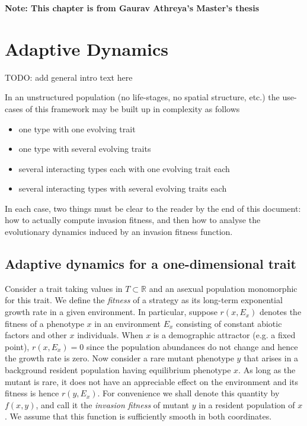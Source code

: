 \textbf{Note: This chapter is from Gaurav Athreya's Master's thesis~\citep{athreya_thesis_2023}}

\chapter{Adaptive Dynamics}


{\color{red}TODO: add general intro text here}

In an unstructured population (no life-stages, no spatial structure, etc.) the use-cases of this framework may be built up in complexity as follows
\begin{itemize} \itemsep -1mm
	\item one type with one evolving trait
	\item one type with several evolving traits
	\item several interacting types each with one evolving trait each
	\item several interacting types with several evolving traits each
\end{itemize}  

In each case, two things must be clear to the reader by the end of this document: how to actually compute invasion fitness, and then how to analyse the evolutionary dynamics induced by an invasion fitness function. 

\section{Adaptive dynamics for a one-dimensional trait}
\label{section:1-dim-AD}

Consider a trait taking values in $T \subset \mathbb{R}$ and an asexual population monomorphic for this trait. We define the \emph{fitness} of a strategy as its long-term exponential growth rate in a given environment. 
In particular, suppose $r(x, E_x)$ denotes the fitness of a phenotype $x$ in an environment $E_x$ consisting of constant abiotic factors and other $x$ individuals.
When $x$ is a demographic attractor (e.g. a fixed point), $r(x, E_x) = 0$ since the population abundances do not change and hence the growth rate is zero. 
Now consider a rare mutant phenotype $y$ that arises in a background resident population having equilibrium phenotype $x$.  
As long as the mutant is rare, it does not have an appreciable effect on the environment and its fitness is hence $r(y, E_x)$. 
For convenience we shall denote this quantity by $f(x,y)$, and call it the \textit{invasion fitness} of mutant $y$ in a resident population of $x$. 
We assume that this function is sufficiently smooth in both coordinates. 

